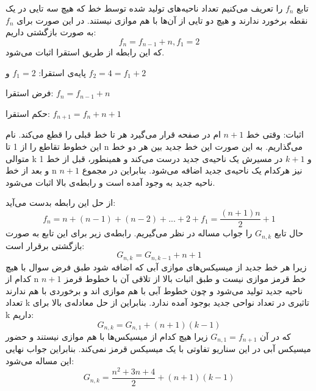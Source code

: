 
\p
        تابع \(f_{n}\) را تعریف می‌کنیم تعداد ناحیه‌های تولید شده توسط  خط که هیچ سه تایی در یک نقطه برخورد ندارند و هیچ دو تایی از آن‌ها با هم موازی نیستند. در این صورت برای \(f_{n}\) به صورت بازگشتی داریم:
        \[ f_{n} = f_{n-1} + n , f_1 = 2 \]
        که این رابطه از طریق استقرا اثبات می‌شود.
        
        پایه‌ی استقرا: \(f_{1} = 2\) و \(f_{2} = 4 = f_{1} + 2\) 
        
        فرض استقرا: \(f_{n} = f_{n-1} + n\) 
        
        حکم استقرا: \(f_{n+1} = f_{n} + n + 1\)
        
        اثبات: وقتی خط \(n+1\) ام در صفحه قرار می‌گیرد هر  تا خط قبلی را قطع می‌کند. نام این خطوط تقاطع را از 1 تا n می‌گذاریم. به این صورت این خط جدید بین هر دو خط متوالی k و \(k+1\) در مسیرش یک ناحیه‌ی جدید درست می‌کند و همینطور، قبل از خط 1 و بعد از خط n نیز هرکدام یک ناحیه‌ی جدید اضافه می‌شود. بنابراین در مجموع \(n+1\) ناحیه جدید به وجود آمده است و رابطه‌ی بالا اثبات می‌شود. 
        
        از حل این رابطه بدست می‌آید:
        \[ f_{n} = n + (n-1) + (n-2) + ... + 2 + f_{1} = \frac{(n+1)n}{2}+1 \]
        حال تابع \(G_{n, k}\) را جواب مساله در نظر می‌گیریم. رابطه‌ی زیر برای این تابع به صورت بازگشتی برقرار است:
        \[ G_{n, k} = G_{n, k-1} + n + 1 \]
        زیرا هر خط جدید از میسیکس‌های موازی آبی که اضافه شود طبق فرض سوال با هیچ کدام از n خط قرمز موازی نیست و طبق اثبات بالا از تلاقی آن با خطوط قرمز \(n+1\) ناحیه جدید تولید می‌شود و چون خطوط آبی با هم موازی اند و برخوردی با هم ندارند تعداد k تاثیری در تعداد نواحی جدید بوجود آمده ندارد. بنابراین از حل معادله‌ی بالا برای k داریم:
        \[ G_{n, k} = G_{n, 1} + (n+1)(k-1) \] که در آن \( G_{n, 1} = f_{n+1} \) زیرا هیچ کدام از میسیکس‌ها با هم موازی نیستند و حضور میسیکس آبی در این سناریو تفاوتی با یک میسیکس قرمز نمی‌کند. بنابراین جواب نهایی این مساله می‌شود:
        \[ G_{n, k} = \frac{n^2 + 3n + 4}{2} + (n+1)(k-1) \]